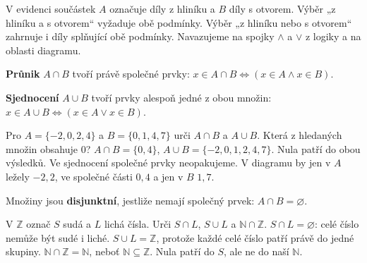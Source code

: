 \documentclass[11pt,a4paper]{article}
\begin{document}
V evidenci součástek $A$ označuje díly z hliníku a $B$ díly s otvorem.
Výběr „z hliníku a s otvorem“ vyžaduje obě podmínky.
Výběr „z hliníku nebo s otvorem“ zahrnuje i díly splňující obě podmínky.
Navazujeme na spojky $\land$ a $\lor$ z logiky a na oblasti diagramu.

\begin{definiceBox}
\textbf{Průnik} $A\cap B$ tvoří právě společné prvky:
$x\in A\cap B\Leftrightarrow (x\in A\land x\in B)$.
\end{definiceBox}
\begin{definiceBox}
\textbf{Sjednocení} $A\cup B$ tvoří prvky alespoň jedné z obou množin:
$x\in A\cup B\Leftrightarrow (x\in A\lor x\in B)$.
\end{definiceBox}
\begin{center}
\end{center}
\begin{prikladReseniBox}[title={P1: výčet i kontrola diagramem},breakable=false]
Pro $A=\{-2,0,2,4\}$ a $B=\{0,1,4,7\}$ urči $A\cap B$ a $A\cup B$.
Která z hledaných množin obsahuje $0$?
\tcblower
$A\cap B=\{0,4\}$, $A\cup B=\{-2,0,1,2,4,7\}$.
Nula patří do obou výsledků. Ve sjednocení společné prvky neopakujeme.
V diagramu by jen v $A$ ležely $-2,2$, ve společné části $0,4$ a jen v $B$ $1,7$.
\end{prikladReseniBox}

\begin{definiceBox}
Množiny jsou \textbf{disjunktní}, jestliže nemají společný prvek:
$A\cap B=\varnothing$.
\end{definiceBox}
\begin{prikladReseniBox}[title={P2: číselný obor je podstatný},breakable=false]
V $\mathbb Z$ označ $S$ sudá a $L$ lichá čísla.
Urči $S\cap L$, $S\cup L$ a $\mathbb N\cap\mathbb Z$.
\tcblower
$S\cap L=\varnothing$: celé číslo nemůže být sudé i liché.
$S\cup L=\mathbb Z$, protože každé celé číslo patří právě do jedné skupiny.
$\mathbb N\cap\mathbb Z=\mathbb N$, neboť $\mathbb N\subseteq\mathbb Z$.
Nula patří do $S$, ale ne do naší $\mathbb N$.
\end{prikladReseniBox}
\end{document}
